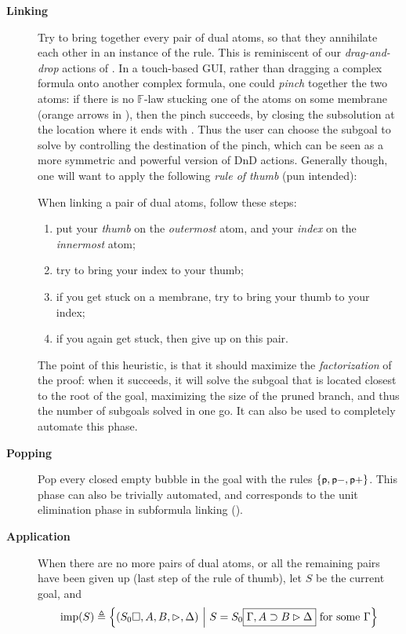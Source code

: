 \begin{description}
  \item[\textbf{Linking}] Try to bring together every pair of dual atoms, so
    that they annihilate each other in an instance of the 
    rule. This is reminiscent of our \emph{drag-and-drop} actions of
    . In a touch-based GUI, rather than dragging a complex formula
    onto another complex formula, one could \emph{pinch} together the two atoms:
    if there is no $\mathbb{F}$-law stucking one of the atoms on some membrane
    (orange arrows in ), then the pinch succeeds, by
    closing the subsolution at the location where it ends with
    . Thus the user can choose the subgoal to solve by
    controlling the destination of the pinch, which can be seen as a more
    symmetric and powerful version of DnD actions. Generally though, one will
    want to apply the following \emph{rule of thumb} (pun intended):
    \begin{fact}
      When linking a pair of dual atoms, follow these steps:
      \begin{enumerate}
        \item put your \emph{thumb} on the \emph{outermost} atom, and your
              \emph{index} on the \emph{innermost} atom;
        \item try to bring your index to your thumb;
        \item if you get stuck on a membrane, try to bring your thumb to your
              index;
        \item if you again get stuck, then give up on this pair.
      \end{enumerate}
    \end{fact}
    The point of this heuristic, is that it should maximize the
    \emph{factorization} of the proof: when it succeeds, it will solve the
    subgoal that is located closest to the root of the goal, maximizing the size
    of the pruned branch, and thus the number of subgoals solved in one go. It
    can also be used to completely automate this phase.

  \item[\textbf{Popping}] Pop every closed empty bubble in the goal with the
  rules $\{\text{\small$\mathsf{p}$},\text{\small$\mathsf{p{-}}$},\text{\small$\mathsf{p{+}}$}\}$. This phase can also be trivially
  automated, and corresponds to the unit elimination phase in subformula linking
  ().

  \item[\textbf{Application}] When there are no more pairs of dual atoms, or all
    the remaining pairs have been given up (last step of the rule of thumb), let
    $S$ be the current goal, and
    $$\mathrm{imp}(S) \triangleq \left\{(S_0\square, A, B, \mathbin{\rhd}, \Delta) ~\middle|~ S = S_0\fbox{$\Gamma,
          A \supset B \mathbin{\rhd} \Delta$} \text{ for some $\Gamma$}\right\}$$


\end{description}
